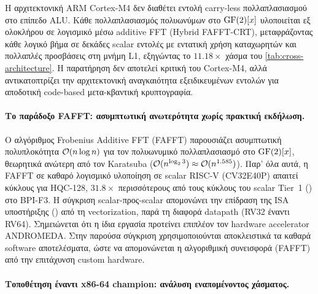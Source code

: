 Η αρχιτεκτονική ARM Cortex-M4 δεν διαθέτει εντολή carry-less
πολλαπλασιασμού στο επίπεδο ALU. Κάθε πολλαπλασιασμός πολυωνύμων στο
$\mathrm{GF}(2)[x]$ υλοποιείται εξ ολοκλήρου σε λογισμικό μέσω additive FFT 
(Hybrid FAFFT-CRT), μεταφράζοντας κάθε λογικό βήμα σε δεκάδες scalar εντολές
με εντατική χρήση καταχωρητών και πολλαπλές προσβάσεις στη μνήμη L1, εξηγώντας το $11.18\times$ χάσμα του
\cref{tab:cross-architecture}. Η παρατήρηση δεν αποτελεί κριτική του Cortex-M4,
αλλά αντικατοπτρίζει την αρχιτεκτονική αναγκαιότητα εξειδικευμένων εντολών για
αποδοτική code-based μετα-κβαντική κρυπτογραφία.

\paragraph{Το παράδοξο FAFFT: ασυμπτωτική ανωτερότητα χωρίς πρακτική εκδήλωση.}
\label{ssec:fafft-paradox}

Ο αλγόριθμος Frobenius Additive FFT (FAFFT) παρουσιάζει ασυμπτωτική
πολυπλοκότητα $\mathcal{O}(n \log n)$ για τον πολυωνυμικό πολλαπλασιασμό στο
$\mathrm{GF}(2)[x]$, θεωρητικά ανώτερη από τον Karatsuba ($\mathcal{O}(n^{\log_2 3})
\approx \mathcal{O}(n^{1.585})$). Παρ' όλα αυτά, η FAFFT σε καθαρό λογισμικό
υλοποίηση σε scalar RISC-V (CV32E40P) απαιτεί
 κύκλους για \Decaps HQC-128, $31.8\times$ περισσότερους
από τους  κύκλους του scalar Tier~1 (\Zbc) στο BPI-F3.
Η σύγκριση scalar-προς-scalar απομονώνει την επίδραση της ISA υποστήριξης
() από τη vectorization, παρά τη διαφορά datapath (RV32 
έναντι RV64). Σημειώνεται ότι η ίδια εργασία
προτείνει επιπλέον τον hardware accelerator ANDROMEDA. Στην παρούσα 
σύγκριση χρησιμοποιούνται αποκλειστικά τα καθαρά software αποτελέσματα, 
ώστε να απομονώνεται η αλγοριθμική συνεισφορά (FAFFT) από την 
επιτάχυνση custom hardware.

\paragraph{Τοποθέτηση έναντι x86-64 champion: ανάλυση εναπομένοντος χάσματος.}
\label{ssec:avx2-gap}

